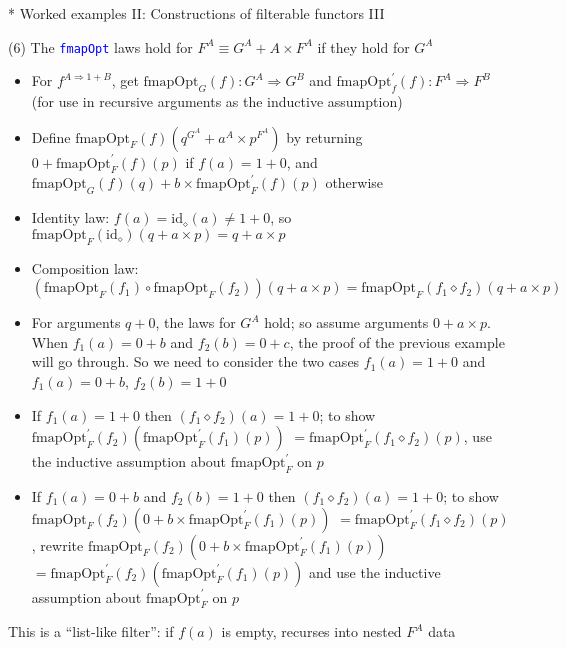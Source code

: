\documentclass[english]{beamer}
\begin{document}
\begin{frame}{{*} Worked examples II: Constructions of filterable functors III}

(6) The \texttt{\textcolor{blue}{\footnotesize{}fmapOpt}} laws hold
for $F^{A}\equiv G^{A}+A\times F^{A}$ if they hold for $G^{A}$
\begin{itemize}
\item {\footnotesize{}For $f^{A\Rightarrow1+B}$, get $\text{fmapOpt}_{G}(f):G^{A}\Rightarrow G^{B}$
and $\text{fmapOpt}_{f}^{\prime}(f):F^{A}\Rightarrow F^{B}$ (for
use in recursive arguments as the inductive assumption)}{\footnotesize \par}
\item {\footnotesize{}Define $\text{fmapOpt}_{F}(f)(q^{G^{A}}+a^{A}\times p^{F^{A}})$
by returning $0+\text{fmapOpt}_{F}^{\prime}(f)(p)$ if $f(a)=1+0$,
and $\text{fmapOpt}_{G}(f)(q)+b\times\text{fmapOpt}_{F}^{\prime}(f)(p)$
otherwise}{\footnotesize \par}
\item Identity law: {\footnotesize{}$f(a)=\text{id}_{\diamond}(a)\neq1+0$},
so {\footnotesize{}$\text{fmapOpt}_{F}(\text{id}_{\diamond})(q+a\times p)=q+a\times p$ }{\footnotesize \par}
\item Composition law: {\footnotesize{}$(\text{fmapOpt}_{F}(f_{1})\circ\text{fmapOpt}_{F}(f_{2}))(q+a\times p)=\text{fmapOpt}_{F}(f_{1}\diamond f_{2})(q+a\times p)$}{\footnotesize \par}
\item {\footnotesize{}For arguments $q+0$, the laws for $G^{A}$ hold;
so assume arguments $0+a\times p$. When $f_{1}(a)=0+b$ and $f_{2}(b)=0+c$,
the proof of the previous example will go through. So we need to consider
the two cases $f_{1}(a)=1+0$ and $f_{1}(a)=0+b$, $f_{2}(b)=1+0$ }{\footnotesize \par}
\item {\footnotesize{}If $f_{1}(a)=1+0$ then $(f_{1}\diamond f_{2})(a)=1+0$;
to show $\text{fmapOpt}_{F}^{\prime}(f_{2})(\text{fmapOpt}_{F}^{\prime}(f_{1})(p))$
$=\text{fmapOpt}_{F}^{\prime}(f_{1}\diamond f_{2})(p)$, use the inductive
assumption about $\text{fmapOpt}_{F}^{\prime}$ on $p$}{\footnotesize \par}
\item {\footnotesize{}If $f_{1}(a)=0+b$ and $f_{2}(b)=1+0$ then $(f_{1}\diamond f_{2})(a)=1+0$;
to show $\text{fmapOpt}_{F}(f_{2})(0+b\times\text{fmapOpt}_{F}^{\prime}(f_{1})(p))$
$=\text{fmapOpt}_{F}^{\prime}(f_{1}\diamond f_{2})(p)$, rewrite $\text{fmapOpt}_{F}(f_{2})(0+b\times\text{fmapOpt}_{F}^{\prime}(f_{1})(p))$
$=\text{fmapOpt}_{F}^{\prime}(f_{2})(\text{fmapOpt}_{F}^{\prime}(f_{1})(p))$
and use the inductive assumption about $\text{fmapOpt}_{F}^{\prime}$
on $p$}{\footnotesize \par}
\end{itemize}
This is a ``list-like filter'': if $f(a)$ is empty, recurses into
nested $F^{A}$ data
\end{frame}
\end{document}
